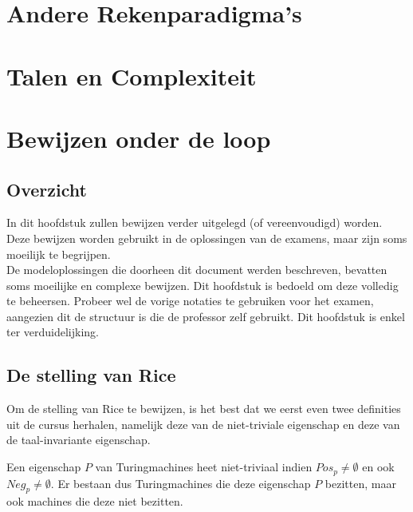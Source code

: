 \documentclass[
10pt,
a4paper,
oneside,
headinclude,footinclude, 
BCOR5mm,
]{scrartcl}
\begin{document}
\lipsum[4-5]

\section{Andere Rekenparadigma's}

\lipsum[10]

\section{Talen en Complexiteit}

\lipsum[11]

\newpage
\section{Bewijzen onder de loop}

\subsection{Overzicht}

\noindent In dit hoofdstuk zullen bewijzen verder uitgelegd (of vereenvoudigd) worden. Deze bewijzen worden gebruikt in de oplossingen van de examens, maar zijn soms moeilijk te begrijpen.\\

\noindent De modeloplossingen die doorheen dit document werden beschreven, bevatten soms moeilijke en complexe bewijzen. Dit hoofdstuk is bedoeld om deze volledig te beheersen. Probeer wel de vorige notaties te gebruiken voor het examen, aangezien dit de structuur is die de professor zelf gebruikt. Dit hoofdstuk is enkel ter verduidelijking.

\subsection{De stelling van Rice}

\noindent Om de stelling van Rice te bewijzen, is het best dat we eerst even twee definities uit de cursus herhalen, namelijk deze van de niet-triviale eigenschap en deze van de taal-invariante eigenschap.

\begin{theorem}
	Een eigenschap $P$ van Turingmachines heet niet-triviaal indien $Pos_p \neq \emptyset$ en ook $Neg_p \neq \emptyset$. Er bestaan dus Turingmachines die deze eigenschap $P$ bezitten, maar ook machines die deze niet bezitten.
\end{theorem}
\end{document}
